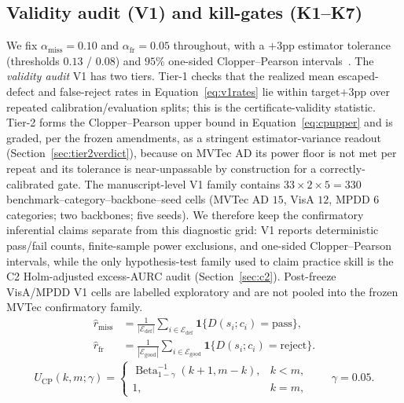 \documentclass[preprint,11pt]{elsarticle}
\begin{document}
\subsection{Validity audit (V1) and kill-gates (K1--K7)}
\label{sec:v1}

We fix $\alpha_{\text{miss}}=0.10$ and $\alpha_{\text{fr}}=0.05$ throughout, with a $+3$pp
estimator tolerance (thresholds $0.13$ / $0.08$) and $95\%$ one-sided Clopper--Pearson
intervals~\citep{clopper1934use}.
The \emph{validity audit} V1 has two tiers. Tier-1 checks that the realized mean escaped-defect and
false-reject rates in Equation~\eqref{eq:v1rates} lie within target$+3$pp over repeated
calibration/evaluation splits; this is the certificate-validity statistic. Tier-2 forms the
Clopper--Pearson upper bound in Equation~\eqref{eq:cpupper} and is graded, per the frozen
amendments, as a stringent estimator-variance readout (Section~\ref{sec:tier2verdict}),
because on MVTec AD its power floor is not met per repeat and its tolerance is near-unpassable by
construction for a correctly-calibrated gate. The manuscript-level V1 family contains
$33\times2\times5=330$ benchmark--category--backbone--seed cells (MVTec AD $15$, VisA $12$, MPDD
$6$ categories; two backbones; five seeds). We therefore keep the confirmatory inferential claims
separate from this diagnostic grid: V1 reports deterministic pass/fail counts, finite-sample power
exclusions, and one-sided Clopper--Pearson intervals, while the only hypothesis-test family used to
claim practice skill is the C2 Holm-adjusted excess-AURC audit (Section~\ref{sec:c2}). Post-freeze
VisA/MPDD V1 cells are labelled exploratory and are not pooled into the frozen MVTec confirmatory
family.
\begin{equation}
\begin{aligned}
\widehat r_{\text{miss}}
&=\frac{1}{|\mathcal E_{\text{def}}|}
\sum_{i\in\mathcal E_{\text{def}}}\mathbf{1}\{D(s_i;c_i)=\text{pass}\},\\[2pt]
\widehat r_{\text{fr}}
&=\frac{1}{|\mathcal E_{\text{good}}|}
\sum_{i\in\mathcal E_{\text{good}}}\mathbf{1}\{D(s_i;c_i)=\text{reject}\}.
\end{aligned}
\label{eq:v1rates}
\end{equation}
\begin{equation}
U_{\text{CP}}(k,m;\gamma)=
\begin{cases}
\operatorname{Beta}^{-1}_{1-\gamma}(k+1,m-k), & k<m,\\
1, & k=m,
\end{cases}
\qquad \gamma=0.05 .
\label{eq:cpupper}
\end{equation}
\end{document}
